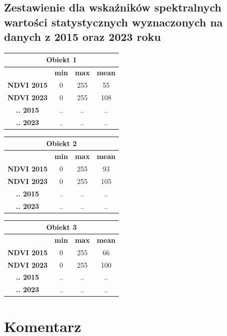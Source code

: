 \documentclass[a4paper,12pt]{article}  %
\begin{document}
\newpage
\subsection{Zestawienie dla wskaźników spektralnych wartości statystycznych wyznaczonych na danych z 2015 oraz 2023 roku}

\begin{table}[h!]
    \centering
    \begin{tabular}{|c|c|c|c|}
    \hline
    \multicolumn{4}{|c|}{\textbf{Obiekt 1}} \\ \hline
    \textbf{} & \textbf{min} & \textbf{max} & \textbf{mean} \\ \hline
    \textbf{NDVI 2015} & 0 & 255 & 55\\ \hline
    \textbf{NDVI 2023} & 0 & 255 & 108\\ \hline
    \textbf{.. 2015} & .. & .. & ..\\ \hline
    \textbf{.. 2023} & .. & .. & ..\\ \hline
    \end{tabular}
\end{table}

\begin{table}[h!]
    \centering
    \begin{tabular}{|c|c|c|c|}
    \hline
    \multicolumn{4}{|c|}{\textbf{Obiekt 2}} \\ \hline
    \textbf{} & \textbf{min} & \textbf{max} & \textbf{mean} \\ \hline
    \textbf{NDVI 2015} & 0 & 255 & 93\\ \hline
    \textbf{NDVI 2023} & 0 & 255 & 105\\ \hline
    \textbf{.. 2015} & .. & .. & ..\\ \hline
    \textbf{.. 2023} & .. & .. & ..\\ \hline
    \end{tabular}
\end{table}

\begin{table}[h!]
    \centering
    \begin{tabular}{|c|c|c|c|}
    \hline
    \multicolumn{4}{|c|}{\textbf{Obiekt 3}} \\ \hline
    \textbf{} & \textbf{min} & \textbf{max} & \textbf{mean} \\ \hline
    \textbf{NDVI 2015} & 0 & 255 & 66\\ \hline
    \textbf{NDVI 2023} & 0 & 255 & 100\\ \hline
    \textbf{.. 2015} & .. & .. & ..\\ \hline
    \textbf{.. 2023} & .. & .. & ..\\ \hline
    \end{tabular}
\end{table}

\section{Komentarz}
\end{document}

